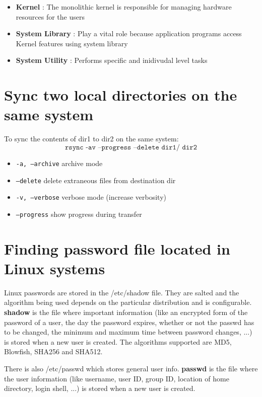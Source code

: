 \begin{itemize}
    \item \textbf{Kernel} : The monolithic kernel is responsible for managing hardware resources for the users
    
    \item \textbf{System Library} : Play a vital role because application programs access Kernel features using system library
    
    \item \textbf{System Utility} : Performs specific and inidivudal level tasks
\end{itemize}

\section{Sync two local directories on the same system}

\noindent
To sync the contents of dir1 to dir2 on the same system:\\
\[\texttt{rsync -av --progress --delete dir1/ dir2}\]

\begin{itemize}
    \item \texttt{-a, --archive} archive mode
    \item \texttt{--delete} delete extraneous files from destination dir
    \item \texttt{-v, --verbose} verbose mode (increase verbosity)
    \item \texttt{--progress} show progress during transfer
\end{itemize}

\section{Finding password file located in Linux systems}

Linux passwords are stored in the /etc/shadow file. They are salted and the algorithm being used depends on the particular distribution and is configurable.  \textbf{shadow} is the file where important information (like an encrypted form of the password of a user, the day the password expires, whether or not the passwd has to be changed, the minimum and maximum time between password changes, ...) is stored when a new user is created.  The algorithms supported are MD5, Blowfish, SHA256 and SHA512.

There is also /etc/passwd which stores general user info.  \textbf{passwd} is the file where the user information (like username, user ID, group ID, location of home directory, login shell, ...) is stored when a new user is created.

